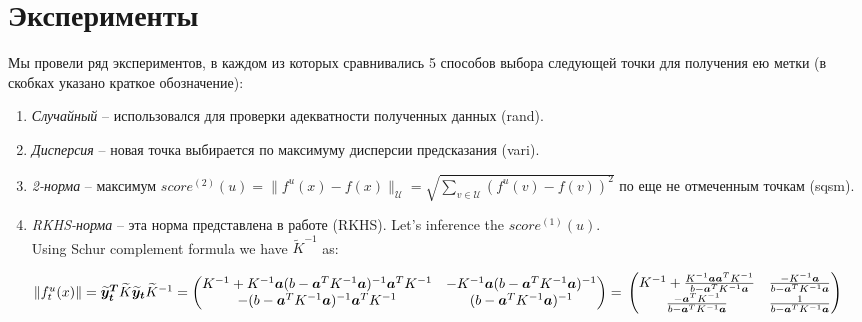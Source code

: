 \documentclass{llncs}
\begin{document}
\section{Эксперименты}
Мы провели ряд экспериментов, в каждом из которых сравнивались 5 способов выбора следующей точки для получения ею метки (в скобках указано краткое обозначение):
\begin{enumerate}
\item {\em Случайный } -- использовался для проверки адекватности полученных данных (rand).\\
\item {\em Дисперсия } -- новая точка выбирается по максимуму дисперсии предсказания 
(vari).\\
\item {\em 2-норма   } -- максимум $ score^{(2)}(u) = \|f^u(x)-f(x)\|_{\mathcal{U}} = \sqrt{\sum\limits_{v \in \mathcal{U}}(f^u(v)-f(v))^2}$ по еще не отмеченным точкам (sqsm). \\
\item {\em RKHS-норма} -- эта норма представлена в работе \cite{av} (RKHS). 
Let's inference the $score^{(1)}(u)$. \\

Using Schur complement formula we have $\widetilde{K}^{-1}$ as:

$
\|f^u_t(x)\| = \vec{\widetilde{y}^T_t} \widetilde{K} \vec{\widetilde{y}_t} \\
\widetilde{K}^{-1} =
\begin{pmatrix}
K^{-1} + K^{-1}\vec{a}(b-\vec{a}^TK^{-1}\vec{a})^{-1}\vec{a}^TK^{-1} & 
-K^{-1}\vec{a}(b-\vec{a}^TK^{-1}\vec{a})^{-1} \\
-(b-\vec{a}^TK^{-1}\vec{a})^{-1}\vec{a}^TK^{-1} & (b-\vec{a}^TK^{-1}\vec{a})^{-1} \\
\end{pmatrix} = 
\\
\begin{pmatrix}
K^{-1} + \frac{K^{-1}\vec{a}\vec{a}^TK^{-1}}{b-\vec{a}^TK^{-1}\vec{a}} & 
\frac{-K^{-1}\vec{a}}{b-\vec{a}^TK^{-1}\vec{a}} \\
\frac{-\vec{a}^TK^{-1}}{b-\vec{a}^TK^{-1}\vec{a}} & \frac{1}{b-\vec{a}^TK^{-1}\vec{a}} \\
\end{pmatrix}
\\
$


\end{enumerate}
\end{document}
